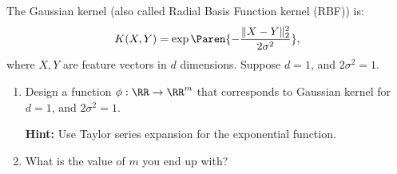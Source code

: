 \documentclass[11pt]{article}
\newenvironment{problem}[2][Problem]{\begin{trivlist}
\item[\hskip \labelsep {\bfseries #1}\hskip \labelsep {\bfseries #2.}]}{\end{trivlist}}
\begin{document}
\begin{problem}{1. (15 points)}
\begin{center}
\end{center}

\end{problem}

\begin{problem}{2. (10 points)}
The Gaussian kernel (also called Radial Basis Function kernel (RBF)) is:
\[
K( X, Y) = \exp\Paren{-\frac{\| X- Y\|_2^2}{2\sigma^2}},
\]
where $ X, Y$ are feature vectors in $d$ dimensions.
Suppose $d=1$, and $2\sigma^2=1$. 
\begin{enumerate}
\item Design a function $\phi:\RR\to \RR^m$ that corresponds to Gaussian kernel for $d=1$, and $2\sigma^2=1$. 

\textbf{Hint:} Use Taylor series expansion for the exponential function. 
\item What is the value of $m$ you end up with?
\end{enumerate}
\end{problem}
\end{document}
